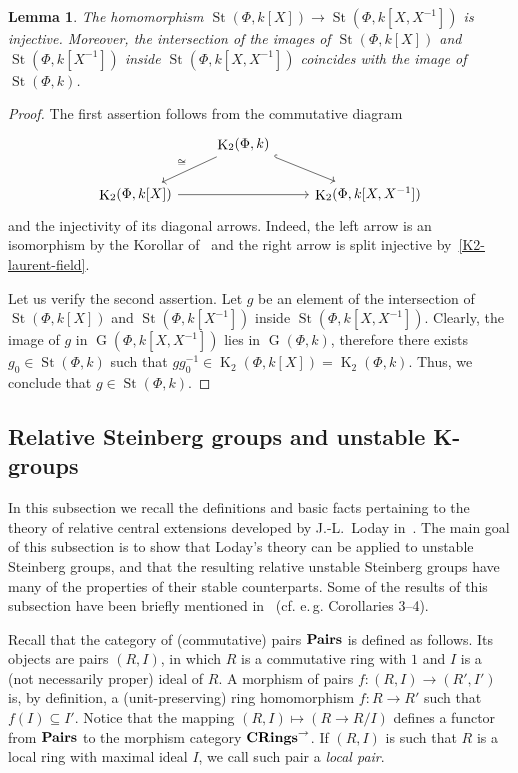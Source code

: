 \documentclass[oneside, 8pt]{amsart}
\newtheorem{lemma}{Lemma}
\theoremstyle{remark}
\theoremstyle{definition}
\numberwithin{lemma}{section}
\numberwithin{prop}{section}
\numberwithin{corollary}{section}
\numberwithin{externaltheorem}{section}
\DeclareMathOperator{\St}{St}
\DeclareMathOperator{\K}{K}
\DeclareMathOperator{\GG}{G}
\newcommand{\inv}{^{-1}}
\newcommand{\catname}[1]{{\normalfont\textbf{#1}}} %
\numberwithin{equation}{section}
\begin{document}
\begin{lemma} \label{field-injectivity} The homomorphism $\St(\Phi, k[X]) \to \St(\Phi, k[X, X^{-1}])$ is injective. Moreover, the intersection of the images of $\St(\Phi, k[X])$ and $\St(\Phi, k[X\inv])$ inside $\St(\Phi, k[X, X\inv])$ coincides with the image of $\St(\Phi, k)$. \end{lemma}
\begin{proof} The first assertion follows from the commutative diagram
\[\begin{tikzcd}  & \K_2(\Phi, k) \arrow{dl}[swap]{\cong} \arrow[dr, hookrightarrow] & \\ \K_2(\Phi, k[X]) \arrow{rr} & & \K_2(\Phi, k[X, X^{-1}]) \end{tikzcd} \]
and the injectivity of its diagonal arrows. Indeed, the left arrow is an isomorphism by the Korollar of~\cite[Satz~1]{Re75} and the right arrow is split injective by~\cref{K2-laurent-field}.

Let us verify the second assertion. Let $g$ be an element of the intersection of $\St(\Phi, k[X])$ and $\St(\Phi, k[X\inv])$ inside $\St(\Phi, k[X, X\inv])$.
Clearly, the image of $g$ in $\GG(\Phi, k[X, X\inv])$ lies in $\GG(\Phi, k)$, therefore there exists $g_0 \in \St(\Phi, k)$ such that $gg_0^{-1} \in \K_2(\Phi, k[X]) = \K_2(\Phi, k)$. Thus, we conclude that $g \in \St(\Phi, k)$.
\end{proof}

\subsection{Relative Steinberg groups and unstable K-groups} \label{sec:quillen}
In this subsection we recall the definitions and basic facts pertaining to the theory of relative central extensions developed by J.-L.~Loday in~\cite{Lo78}. The main goal of this subsection is to show that Loday's theory can be applied to unstable Steinberg groups, and that the resulting relative unstable Steinberg groups have many of the properties of their stable counterparts. Some of the results of this subsection have been briefly mentioned in~\cite{S15} (cf. e.\,g. Corollaries 3--4).

Recall that the category of (commutative) pairs $\catname{Pairs}$ is defined as follows. Its objects are pairs $(R, I)$, in which $R$ is a commutative ring with $1$ and $I$ is a (not necessarily proper) ideal of $R$. A morphism of pairs $f \colon (R, I) \to (R', I')$ is, by definition, a (unit-preserving) ring homomorphism $f \colon R \to R'$ such that $f(I) \subseteq I'$. Notice that the mapping $(R, I) \mapsto (R \to R/I)$ defines a functor from $\catname{Pairs}$ to the morphism category $\catname{CRings}^\rightarrow$.
If $(R, I)$ is such that $R$ is a local ring with maximal ideal $I$, we call such pair a {\it local pair}.
\end{document}
